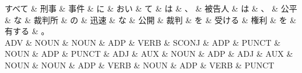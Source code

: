 \documentclass[tikz,border=5pt]{standalone}
\begin{document}
\normalsize
\begin{dependency}[edge unit distance=10.9pt]
    \begin{deptext}[column sep=1em]
        すべて \& 刑事 \& 事件 \& に \& おい \& て \& は \& 、 \& 被告人 \& は \& 、 \& 公平 \& な \& 裁判所 \& の \& 迅速 \& な \& 公開 \& 裁判 \& を \& 受ける \& 権利 \& を \& 有する \& 。\\
        ADV \& NOUN \& NOUN \& ADP \& VERB \& SCONJ \& ADP \& PUNCT \& NOUN \& ADP \& PUNCT \& ADJ \& AUX \& NOUN \& ADP \& ADJ \& AUX \& NOUN \& NOUN \& ADP \& VERB \& NOUN \& ADP \& VERB \& PUNCT\\
    \end{deptext}
\end{dependency}
\end{document}
